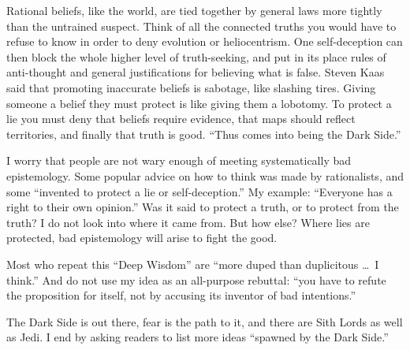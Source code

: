 Rational beliefs, like the world, are tied together by general laws more tightly than the untrained suspect. Think of all the connected truths you would have to refuse to know in order to deny evolution or heliocentrism. One self-deception can then block the whole higher level of truth-seeking, and put in its place rules of anti-thought and general justifications for believing what is false. Steven Kaas said that promoting inaccurate beliefs is sabotage, like slashing tires. Giving someone a belief they must protect is like giving them a lobotomy. To protect a lie you must deny that beliefs require evidence, that maps should reflect territories, and finally that truth is good. ``Thus comes into being the Dark Side.''

I worry that people are not wary enough of meeting systematically bad epistemology. Some popular advice on how to think was made by rationalists, and some ``invented to protect a lie or self-deception.'' My example: ``Everyone has a right to their own opinion.'' Was it said to protect a truth, or to protect from the truth? I do not look into where it came from.  But how else? Where lies are protected, bad epistemology will arise to fight the good.

Most who repeat this ``Deep Wisdom'' are ``more duped than duplicitous \ldots\ I think.'' And do not use my idea as an all-purpose rebuttal: ``you have to refute the proposition for itself, not by accusing its inventor of bad intentions.''

The Dark Side is out there, fear is the path to it, and there are Sith Lords as well as Jedi. I end by asking readers to list more ideas ``spawned by the Dark Side.''
